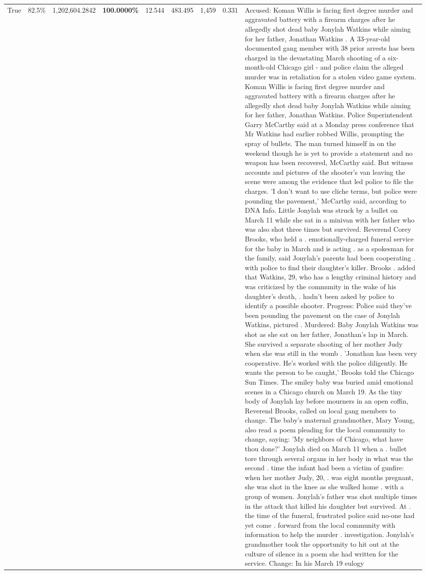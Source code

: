 \begin{table}[H]
\begin{tabular}{lllrlllll}
True & 82.5\% & 1,202,604.2842 & \bfseries \color{red} 100.0000\% & 12.544 & 483.495 & 1,459 & 0.331 & Accused: Koman Willis is facing first degree murder and aggravated battery with a firearm charges after he allegedly shot dead baby Jonylah Watkins while aiming for her father, Jonathan Watkins . A 33-year-old documented gang member with 38 prior arrests has been charged in the devastating March shooting of a six-month-old Chicago girl - and police claim the alleged murder was in retaliation for a stolen video game system. Koman Willis is facing first degree murder and aggravated battery with a firearm charges after he allegedly shot dead baby Jonylah Watkins while aiming for her father, Jonathan Watkins. Police Superintendent Garry McCarthy said at a Monday press conference that Mr Watkins had earlier robbed Willis, prompting the spray of bullets. The man turned himself in on the weekend though he is yet to provide a statement and no weapon has been recovered, McCarthy said. But witness accounts and pictures of the shooter's van leaving the scene were among the evidence that led police to file the charges. 'I don't want to use cliche terms, but police were pounding the pavement,' McCarthy said, according to DNA Info. Little Jonylah was struck by a bullet on March 11 while she sat in a minivan with her father who was also shot three times but survived. Reverend Corey Brooks, who held a . emotionally-charged funeral service for the baby in March and is acting . as a spokesman for the family, said Jonylah's parents had been cooperating . with police to find their daughter's killer. Brooks . added that Watkins, 29, who has a lengthy criminal history and was criticized by the community in the wake of his daughter's death, . hadn't been asked by police to identify a possible shooter. Progress: Police said they've been pounding the pavement on the case of Jonylah Watkins, pictured . Murdered: Baby Jonylah Watkins was shot as she sat on her father, Jonathan's lap in March. She survived a separate shooting of her mother Judy when she was still in the womb . 'Jonathan has been very cooperative. He's worked with the police diligently. He wants the person to be caught,' Brooks told the Chicago Sun Times. The smiley baby was buried amid emotional scenes in a Chicago church on March 19. As the tiny body of Jonylah lay before mourners in an open coffin, Reverend Brooks, called on local gang members to change. The baby's maternal grandmother, Mary Young, also read a poem pleading for the local community to change, saying: 'My neighbors of Chicago, what have thou done?' Jonylah died on March 11 when a . bullet tore through several organs in her body in what was the second . time the infant had been a victim of gunfire: when her mother Judy, 20, . was eight months pregnant, she was shot in the knee as she walked home . with a group of women. Jonylah's father was shot multiple times in the attack that killed his daughter but survived. At . the time of the funeral, frustrated police said no-one had yet come . forward from the local community with information to help the murder . investigation. Jonylah's grandmother took the opportunity to hit out at the culture of silence in a poem she had written for the service. Change: In his March 19 eulogy 
\end{tabular}
\end{table}
